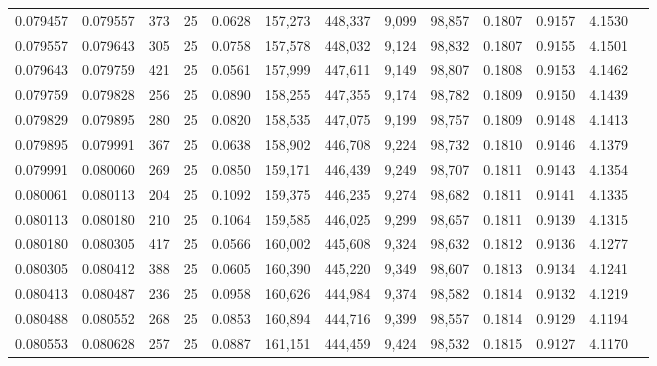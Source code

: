 \begin{tabular}{rrrrrrrrrrrrr}
0.079457 & 0.079557 &   373 &  25 &                                     0.0628 & 157,273 & 448,337 &   9,099 &  98,857 & 0.1807 & 0.9157 & 4.1530 \\
0.079557 & 0.079643 &   305 &  25 &                                     0.0758 & 157,578 & 448,032 &   9,124 &  98,832 & 0.1807 & 0.9155 & 4.1501 \\
0.079643 & 0.079759 &   421 &  25 &                                     0.0561 & 157,999 & 447,611 &   9,149 &  98,807 & 0.1808 & 0.9153 & 4.1462 \\
0.079759 & 0.079828 &   256 &  25 &                                     0.0890 & 158,255 & 447,355 &   9,174 &  98,782 & 0.1809 & 0.9150 & 4.1439 \\
0.079829 & 0.079895 &   280 &  25 &                                     0.0820 & 158,535 & 447,075 &   9,199 &  98,757 & 0.1809 & 0.9148 & 4.1413 \\
0.079895 & 0.079991 &   367 &  25 &                                     0.0638 & 158,902 & 446,708 &   9,224 &  98,732 & 0.1810 & 0.9146 & 4.1379 \\
0.079991 & 0.080060 &   269 &  25 &                                     0.0850 & 159,171 & 446,439 &   9,249 &  98,707 & 0.1811 & 0.9143 & 4.1354 \\
0.080061 & 0.080113 &   204 &  25 &                                     0.1092 & 159,375 & 446,235 &   9,274 &  98,682 & 0.1811 & 0.9141 & 4.1335 \\
0.080113 & 0.080180 &   210 &  25 &                                     0.1064 & 159,585 & 446,025 &   9,299 &  98,657 & 0.1811 & 0.9139 & 4.1315 \\
0.080180 & 0.080305 &   417 &  25 &                                     0.0566 & 160,002 & 445,608 &   9,324 &  98,632 & 0.1812 & 0.9136 & 4.1277 \\
0.080305 & 0.080412 &   388 &  25 &                                     0.0605 & 160,390 & 445,220 &   9,349 &  98,607 & 0.1813 & 0.9134 & 4.1241 \\
0.080413 & 0.080487 &   236 &  25 &                                     0.0958 & 160,626 & 444,984 &   9,374 &  98,582 & 0.1814 & 0.9132 & 4.1219 \\
0.080488 & 0.080552 &   268 &  25 &                                     0.0853 & 160,894 & 444,716 &   9,399 &  98,557 & 0.1814 & 0.9129 & 4.1194 \\
0.080553 & 0.080628 &   257 &  25 &                                     0.0887 & 161,151 & 444,459 &   9,424 &  98,532 & 0.1815 & 0.9127 & 4.1170 \\

\end{tabular}
